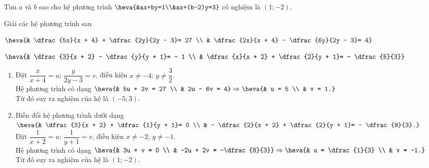 \begin{bt}
	Tìm $a$ và $b$ sao cho hệ phương trình $\heva{&ax+by=1\\&ax+(b-2)y=3}$ có nghiệm là $(1;-2)$.
\end{bt}
\begin{bt}%
	Giải các hệ phương trình sau
	\begin{enumEX}{2}
	\item $\heva{& \dfrac{5x}{x + 4} + \dfrac{2y}{2y - 3}= 27 \\ & \dfrac{2x}{x + 4} - \dfrac{6y}{2y - 3}= 4}$
	\item $\heva{& \dfrac{3}{x + 2} - \dfrac{y}{y + 1}= - 1 \\ & \dfrac{x}{x + 2} + \dfrac{2}{y + 1}= - \dfrac{5}{3}}$
	\end{enumEX}
	\loigiai
	{
	\begin{enumerate}
	\item Đặt $\dfrac{x}{x + 4}= u$; $\dfrac{y}{2y - 3}= v$, điều kiện $x \neq -4$; $y \neq \dfrac{3}{2}$.\\
	Hệ phương trình có dạng $\heva{& 5u + 2v = 27 \\ & 2u - 6v = 4} \Rightarrow \heva{& u = 5 \\ & v = 1.}$\\
	Từ đó suy ra nghiệm của hệ là $\left( -5; 3\right) $.
	\item Biến đổi hệ phương trình dưới dạng $\heva{& \dfrac{3}{x + 2} + \dfrac{1}{y + 1}= 0 \\ & - \dfrac{2}{x + 2} + \dfrac{2}{y + 1}= - \dfrac{8}{3}.}$\\
	Đặt $\dfrac{1}{x + 2}= u$; $\dfrac{1}{y + 1}= v$, điều kiện $x \neq -2$; $y \neq -1$.\\
	Hệ phương trình có dạng $\heva{& 3u + v = 0 \\ & -2u + 2v = -\dfrac{8}{3}} \Rightarrow \heva{& u = \dfrac{1}{3} \\ & v = -1.}$\\
	Từ đó suy ra nghiệm của hệ là $\left( 1; -2\right)$. 
	\end{enumerate}
	}
\end{bt}
